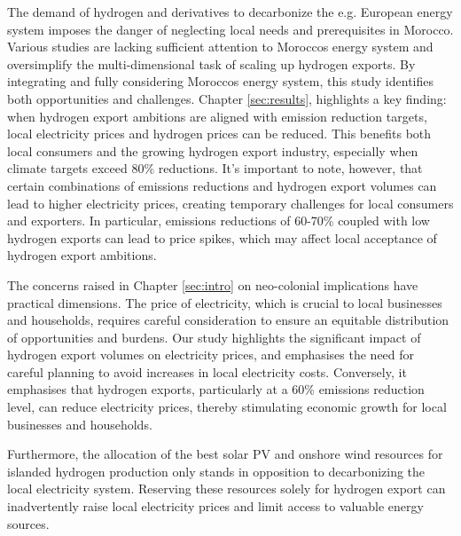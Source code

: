 The demand of hydrogen and derivatives to decarbonize the e.g. European energy system imposes the danger of neglecting local needs and prerequisites in Morocco. Various studies \cite{vanWijk2021, AbouSeada2022, vanderZwaan2021, Schellekens2010, Touili2022, Timmerberg2019a, Sens2022} are lacking sufficient attention to Moroccos energy system and oversimplify the multi-dimensional task of scaling up hydrogen exports. By integrating and fully considering Moroccos energy system, this study identifies both opportunities and challenges. Chapter \ref{sec:results}, highlights a key finding: when hydrogen export ambitions are aligned with emission reduction targets, local electricity prices and hydrogen prices can be reduced. This benefits both local consumers and the growing hydrogen export industry, especially when climate targets exceed 80\% reductions. It's important to note, however, that certain combinations of emissions reductions and hydrogen export volumes can lead to higher electricity prices, creating temporary challenges for local consumers and exporters. In particular, emissions reductions of 60-70\% coupled with low hydrogen exports can lead to price spikes, which may affect local acceptance of hydrogen export ambitions.

The concerns raised in Chapter \ref{sec:intro} on neo-colonial implications have practical dimensions. The price of electricity, which is crucial to local businesses and households, requires careful consideration to ensure an equitable distribution of opportunities and burdens. Our study highlights the significant impact of hydrogen export volumes on electricity prices, and emphasises the need for careful planning to avoid increases in local electricity costs. Conversely, it emphasises that hydrogen exports, particularly at a 60\% emissions reduction level, can reduce electricity prices, thereby stimulating economic growth for local businesses and households.


Furthermore, the allocation of the best solar PV and onshore wind resources for islanded hydrogen production only stands in opposition to decarbonizing the local electricity system. Reserving these resources solely for hydrogen export can inadvertently raise local electricity prices and limit access to valuable energy sources.

